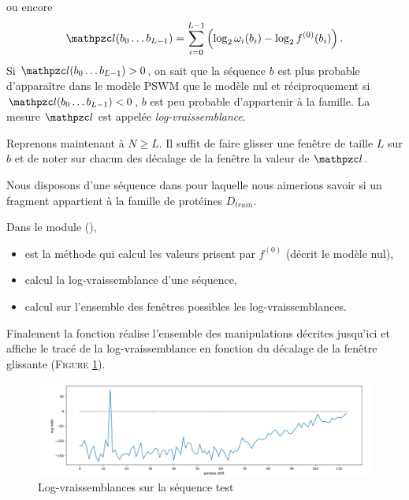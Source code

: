 \documentclass[a4paper, french]{article}
\begin{document}
\newpage
ou encore
\begin{equation*}
    \lodd(b_0\ldots b_{L-1}) =
    \sum_{i=0}^{L-1} \left(\log_2 \omega_i(b_i) - \log_2 f^{(0)}(b_i)\right).
\end{equation*}
Si $\lodd(b_0\ldots b_{L-1})>0$, on sait que la s\'equence $b$
est plus probable d'appara\^itre dans le mod\`ele PSWM que le mod\`ele nul
et r\'eciproquement si $\lodd(b_0\ldots b_{L-1})<0$, $b$ est
peu probable d'appartenir \`a la famille.
La mesure $\lodd$ est appel\'ee \emph{log-vraissemblance}.

Reprenons maintenant \`a $N\geq L$. Il suffit de faire glisser une fen\^etre
de taille $L$ sur $b$ et de noter sur chacun des d\'ecalage de la fen\^etre
la valeur de $\lodd$.

Nous disposons d'une s\'equence dans  pour laquelle
nous aimerions savoir si un fragment appartient \`a la famille de
prot\'eines $D_{train}$.

Dans le module  (),
\begin{itemize}
    \item {} est la m\'ethode qui calcul les
        valeurs prisent par $f^{(0)}$ (d\'ecrit le mod\`ele nul),
    \item {} calcul la log-vraissemblance
        d'une s\'equence,
    \item {} calcul sur l'ensemble des
        fen\^etres possibles les log-vraissemblances.
\end{itemize}
Finalement la fonction  r\'ealise l'ensemble des manipulations
d\'ecrites jusqu'ici et affiche le trac\'e de la log-vraissemblance en fonction
du d\'ecalage de la fen\^etre glissante
(F\textsc{igure} \ref{fig:log_odds}).

\begin{figure}[h]
    \begin{center}
        \includegraphics[width=15cm]{images/log_odds}
        \caption{Log-vraissemblances sur la s\'equence test}
        \label{fig:log_odds}
    \end{center}
\end{figure}
\end{document}
